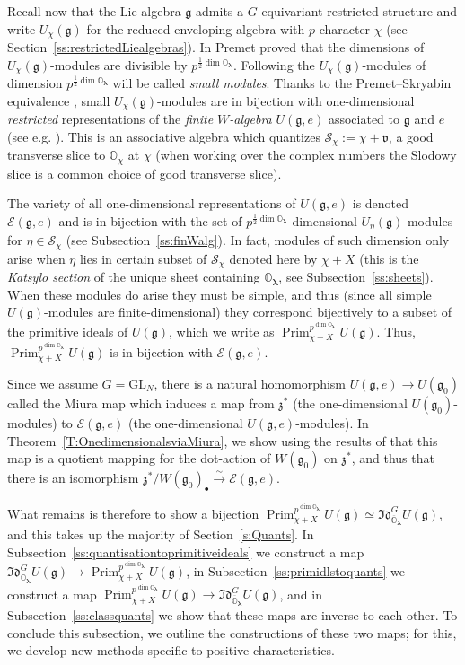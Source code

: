 \documentclass[twoside,12pt,reqno]{amsart}
\theoremstyle{remark}
\numberwithin{equation}{section}
\def\isoto{\overset{\sim}{\longrightarrow}}
\def\Prim{\operatorname{Prim}}
\def\blambda{{\bm{\lambda}}}
\def\o{\overline}
\def\O{{\mathbb O}}
\def\GL{\mathrm{GL}}
\def\g{{\mathfrak g}}
\def\v{\mathfrak{v}}
\def\z{\mathfrak{z}}
\def\Idl{\mathfrak{Id}}
\def\E{\mathcal{E}}
\renewcommand{\S}{\mathcal{S}}
\begin{document}
Recall now that the Lie algebra $\g$ admits a $G$-equivariant restricted structure and write $U_\chi(\g)$ for the reduced enveloping algebra with $p$-character $\chi$ (see Section~\ref{ss:restrictedLiealgebras}). In \cite{PrKW} Premet proved that the dimensions of $U_\chi(\g)$-modules are divisible by $p^{\frac{1}{2}\dim \O_\blambda}$. Following \cite{GT, PT20} the $U_\chi(\g)$-modules of dimension $p^{\frac{1}{2}\dim \O_\blambda}$ will be called {\it small modules}.
Thanks to the Premet--Skryabin equivalence \cite[Theorem~9.2]{GTmodular}, small $U_\chi(\g)$-modules are in bijection with one-dimensional {\em restricted} representations of the {\em finite $W$-algebra} $U(\g,e)$ associated to $\g$ and $e$ (see e.g. \cite[Lemma 2.5]{PT20}). This is an associative algebra which quantizes $\S_\chi:=\chi+\v$, a good transverse slice to $\O_\chi$ at $\chi$ (when working over the complex numbers the Slodowy slice is a common choice of good transverse slice).

The variety of all one-dimensional representations of $U(\g,e)$ is denoted $\E(\g,e)$ and is in bijection with the set of $p^{\frac{1}{2}\dim \O_\blambda}$-dimensional $U_\eta(\g)$-modules for $\eta\in\S_\chi$ (see Subsection~\ref{ss:finWalg}). In fact, modules of such dimension only arise when $\eta$ lies in certain subset of $\S_\chi$ denoted here by $\chi+X$ (this is the {\em Katsylo section} of the unique sheet containing $\O_\blambda$, see Subsection~\ref{ss:sheets}). When these modules do arise they must be simple, and thus (since all simple $U(\g)$-modules are finite-dimensional) they correspond bijectively to a subset of the primitive ideals of $U(\g)$, which we write as $\Prim_{\chi + X}^{p^{\dim \O_\blambda}} U(\g)$. Thus, $\Prim_{\chi + X}^{p^{\dim \O_\blambda}} U(\g)$ is in bijection with $\E(\g,e)$.

Since we assume $G=\GL_N$, there is a natural homomorphism $U(\g,e)\to U(\g_0)$ called the Miura map which induces a map from $\z^*$ (the one-dimensional $U(\g_0)$-modules) to $\E(\g,e)$ (the one-dimensional $U(\g,e)$-modules). In Theorem~\ref{T:OnedimensionalsviaMiura}, we show using the results of \cite{GT} that this map is a quotient mapping for the dot-action of $W(\g_0)$ on $\z^*$, and thus that there is an isomorphism $\z^*/W(\g_0)_\bullet\isoto \E(\g,e)$.

What remains is therefore to show a bijection $\Prim_{\chi+X}^{p^{\dim \O_\blambda}}U(\g)\simeq \Idl_{\o\O_\blambda}^G U(\g)$, and this takes up the majority of Section~\ref{s:Quants}. In Subsection~\ref{ss:quantisationtoprimitiveideals} we construct a map $\Idl_{\o\O_\blambda}^G U(\g)\to \Prim_{\chi+X}^{p^{\dim \O_\blambda}}U(\g)$, in Subsection~\ref{ss:primidlstoquants} we construct a map $\Prim_{\chi+X}^{p^{\dim \O_\blambda}}U(\g) \to \Idl_{\o\O_\blambda}^G U(\g)$, and in Subsection~\ref{ss:classquants} we show that these maps are inverse to each other. To conclude this subsection, we outline the constructions of these two maps; for this, we develop new methods specific to positive characteristics.
\end{document}
